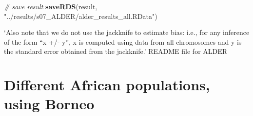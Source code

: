 \documentclass[
]{article}
\newenvironment{Shaded}{\begin{snugshade}}{\end{snugshade}}
\newcommand{\AttributeTok}[1]{\textcolor[rgb]{0.13,0.29,0.53}{#1}}
\newcommand{\CommentTok}[1]{\textcolor[rgb]{0.56,0.35,0.01}{\textit{#1}}}
\newcommand{\FunctionTok}[1]{\textcolor[rgb]{0.13,0.29,0.53}{\textbf{#1}}}
\newcommand{\NormalTok}[1]{#1}
\newcommand{\OtherTok}[1]{\textcolor[rgb]{0.56,0.35,0.01}{#1}}
\newcommand{\SpecialCharTok}[1]{\textcolor[rgb]{0.81,0.36,0.00}{\textbf{#1}}}
\newcommand{\StringTok}[1]{\textcolor[rgb]{0.31,0.60,0.02}{#1}}
\begin{document}
\begin{Shaded}
\begin{Highlighting}[]
\CommentTok{\# save result}
\FunctionTok{saveRDS}\NormalTok{(result, }\StringTok{"../results/s07\_ALDER/alder\_results\_all.RData"}\NormalTok{)}
\end{Highlighting}
\end{Shaded}

`Also note that we do not use the jackknife to estimate bias: i.e., for
any inference of the form ``x +/- y'', x is computed using data from all
chromosomes and y is the standard error obtained from the jackknife.'
README file for ALDER

\begin{Shaded}
\end{Shaded}

\section{Different African populations, using
Borneo}\label{different-african-populations-using-borneo}
\end{document}
